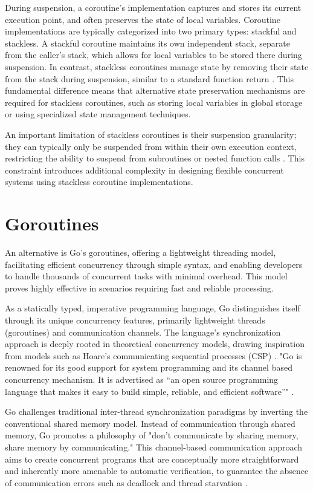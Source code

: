\documentclass[]{final}
\begin{document}
During suspension, a coroutine's implementation captures and stores
its current execution point, and often preserves the state of local variables.
Coroutine implementations are typically categorized into two primary types:
stackful and stackless. A stackful coroutine maintains its own independent
stack, separate from the caller's stack, which allows for local variables
to be stored there during suspension. In contrast, stackless coroutines
manage state by removing their state from the stack
during suspension, similar to a standard function return \cite{belson_survey_2019}.
This fundamental difference means that alternative state preservation
mechanisms are required for stackless coroutines, such as storing
local variables in global storage or using specialized state management techniques.

An important limitation of stackless coroutines is their suspension granularity;
they can typically only be suspended from within their own execution context,
restricting the ability to suspend from subroutines or nested function calls
\cite{belson_survey_2019}. This constraint introduces additional complexity
in designing flexible concurrent systems using stackless coroutine implementations.

\section{Goroutines}

An alternative is Go’s goroutines, offering a lightweight threading model,
facilitating efficient concurrency through
simple syntax, and enabling developers to handle thousands of concurrent tasks with
minimal overhead. This model proves highly effective in scenarios requiring fast
and reliable processing.

As a statically typed, imperative programming language, Go distinguishes
itself through its unique concurrency features, primarily lightweight threads
(goroutines) and communication channels.
The language's synchronization approach
is deeply rooted in theoretical concurrency models,
drawing inspiration from models such as Hoare's communicating sequential
processes (CSP) \cite{lange_empirical_2019}.
"Go is renowned for its good support for system programming
and its channel based concurrency mechanism. It is advertised
as “an open source programming
language that makes it easy to build simple, reliable, and
efficient software”" \cite{lange_empirical_2019}.

Go challenges traditional inter-thread synchronization
paradigms by inverting the conventional shared memory model. Instead
of communication through shared memory, Go promotes a philosophy of
"don't communicate by sharing memory, share memory by communicating."
This channel-based communication approach aims to create concurrent programs
that are conceptually more straightforward and inherently more amenable
to automatic verification, to guarantee
the absence of communication errors such as deadlock and
thread starvation \cite{lange_empirical_2019}.
\end{document}
